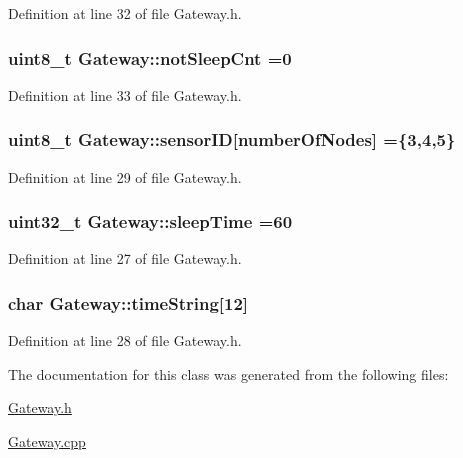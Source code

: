 Definition at line 32 of file Gateway.\+h.

\subsubsection[{\texorpdfstring{not\+Sleep\+Cnt}{notSleepCnt}}]{\setlength{\rightskip}{0pt plus 5cm}uint8\+\_\+t Gateway\+::not\+Sleep\+Cnt =0\hspace{0.3cm}{\ttfamily [private]}}\hypertarget{class_gateway_a22eff85e24fa38ad576f72aaa27c23d7}{}\label{class_gateway_a22eff85e24fa38ad576f72aaa27c23d7}


Definition at line 33 of file Gateway.\+h.

\subsubsection[{\texorpdfstring{sensor\+ID}{sensorID}}]{\setlength{\rightskip}{0pt plus 5cm}uint8\+\_\+t Gateway\+::sensor\+ID\mbox{[}{\bf number\+Of\+Nodes}\mbox{]} =\{3,4,5\}\hspace{0.3cm}{\ttfamily [private]}}\hypertarget{class_gateway_a908079e6afe54a56c710b6ba5a3af7ad}{}\label{class_gateway_a908079e6afe54a56c710b6ba5a3af7ad}


Definition at line 29 of file Gateway.\+h.

\subsubsection[{\texorpdfstring{sleep\+Time}{sleepTime}}]{\setlength{\rightskip}{0pt plus 5cm}uint32\+\_\+t Gateway\+::sleep\+Time =60\hspace{0.3cm}{\ttfamily [private]}}\hypertarget{class_gateway_abad37ae0964cf2a1913f616888a74df1}{}\label{class_gateway_abad37ae0964cf2a1913f616888a74df1}


Definition at line 27 of file Gateway.\+h.

\subsubsection[{\texorpdfstring{time\+String}{timeString}}]{\setlength{\rightskip}{0pt plus 5cm}char Gateway\+::time\+String\mbox{[}12\mbox{]}\hspace{0.3cm}{\ttfamily [private]}}\hypertarget{class_gateway_a7e3225e6afd4360659530bf39baa67e1}{}\label{class_gateway_a7e3225e6afd4360659530bf39baa67e1}


Definition at line 28 of file Gateway.\+h.



The documentation for this class was generated from the following files\+:\begin{DoxyCompactItemize}
\item 
\hyperlink{_gateway_8h}{Gateway.\+h}\item 
\hyperlink{_gateway_8cpp}{Gateway.\+cpp}\end{DoxyCompactItemize}
